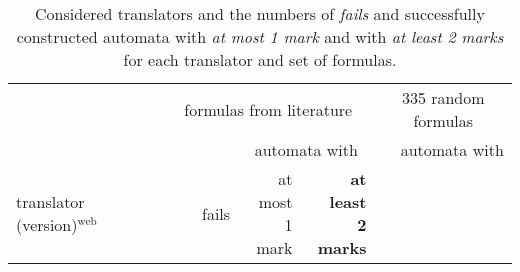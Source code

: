 \documentclass[a4paper,UKenglish,cleveref,autoref,thm-restate]{lipics-v2021}
\begin{document}
\begin{table}[t]
  \caption{Considered translators and the numbers of \emph{fails} and
    successfully constructed automata with \emph{at most 1 mark} and
    with \emph{at least 2 marks} for each translator and set of
    formulas.}
\label{tab:ltltranslators}
\centering
%
%
\setlength{\tabcolsep}{5.7pt}
\begin{tabular}{lrrrrrrr}
  \toprule
  && \multicolumn{3}{c}{\!348 formulas from literature\!} & \multicolumn{3}{c}{335 random formulas}\\
  \cmidrule(lr){3-5} \cmidrule(lr){6-8}
  &&& \multicolumn{2}{c}{automata with} && \multicolumn{2}{c}{automata with}\\
  \cmidrule(lr){4-5} \cmidrule(lr){7-8}
  \multicolumn{2}{l}{translator ~~~ (version)$^{\text{web}}$}
  & ~~~~fails & \makecell[r]{at most\\[-1ex] 1 mark} & \makecell[r]{\textbf{at least}\\[-1ex] \textbf{2 marks}}

\end{tabular}
\end{table}
\end{document}

